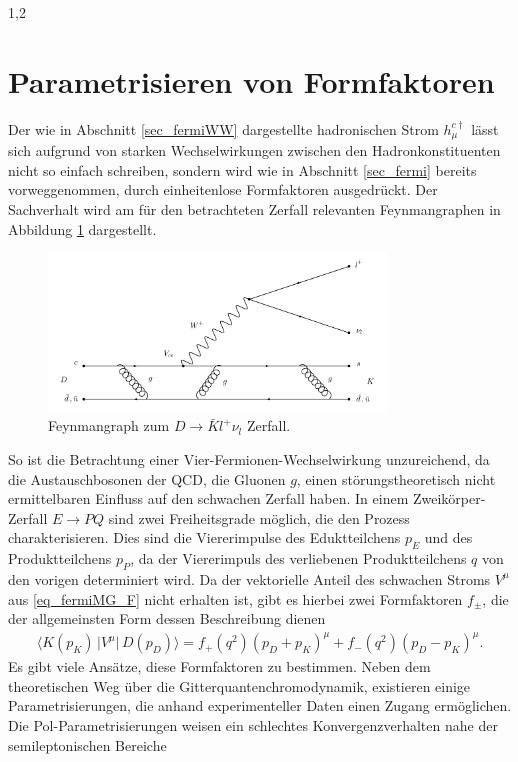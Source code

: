 \documentclass[11pt,a4paper,twoside]{report}
\begin{document}
\begin{spacing}{1,2}
\section{Parametrisieren von Formfaktoren}
\label{sec_paramForm}
Der wie in Abschnitt \ref{sec_fermiWW} dargestellte hadronischen Strom $h_\mu^{c\dagger}$ lässt sich aufgrund von starken Wechselwirkungen zwischen den 
Hadronkonstituenten nicht so einfach schreiben, sondern wird wie in Abschnitt \ref{sec_fermi} bereits vorweggenommen, durch einheitenlose Formfaktoren 
ausgedrückt\cite{KimPham}. Der Sachverhalt wird am für den betrachteten Zerfall relevanten Feynmangraphen in Abbildung \ref{pic_Dfeyn} dargestellt.
\begin{figure}[H]
\includegraphics[width=0.8\textwidth]{Abbildungen/DFeyn.png}
\caption{Feynmangraph zum $D\rightarrow \bar K l^+ \nu_l$ Zerfall.}
\label{pic_Dfeyn}
\end{figure}
\noindent
So ist die Betrachtung einer Vier-Fermionen-Wechselwirkung unzureichend, da die Austauschbosonen der QCD, die Gluonen $g$, einen störungstheoretisch nicht
ermittelbaren Einfluss auf den schwachen Zerfall haben.
In einem Zweikörper-Zerfall $E\rightarrow PQ$ sind zwei Freiheitsgrade möglich, die den Prozess charakterisieren. Dies sind die Viererimpulse des Eduktteilchens
$p_E$ und des Produktteilchens $p_P$, da der Viererimpuls des verliebenen Produktteilchens $q$ von den vorigen determiniert wird. Da der vektorielle 
Anteil des schwachen Stroms $V^\mu$ aus \eqref{eq_fermiMG_F} nicht erhalten ist, gibt es hierbei zwei Formfaktoren $f_\pm$, die der allgemeinsten Form
dessen Beschreibung dienen
\begin{align}
 \big\langle K(p_K)\,\big|V^\mu\big|\, D(p_D)\big\rangle = f_+(q^2)(p_D+p_K)^\mu + f_-(q^2)(p_D-p_K)^\mu.
\end{align}
Es gibt viele Ansätze, diese Formfaktoren zu bestimmen. Neben dem theoretischen Weg über die Gitterquantenchromodynamik, existieren einige Parametrisierungen,
die anhand experimenteller Daten einen Zugang ermöglichen. Die Pol-Parametrisierungen weisen ein schlechtes Konvergenzverhalten nahe der semileptonischen Bereiche

\end{spacing}
\end{document}

